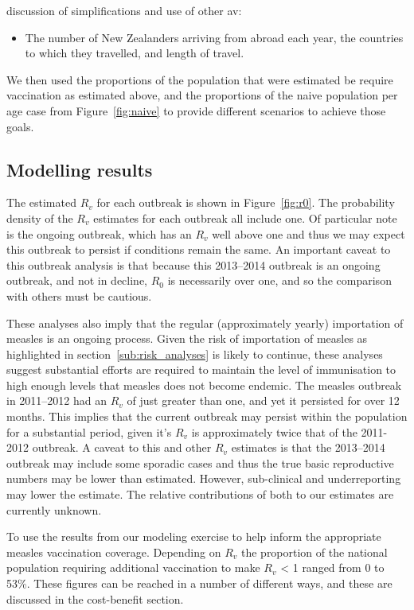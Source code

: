 \documentclass{article}
\begin{document}
discussion of simplifications and use of other av:
\begin {itemize}
\item The number of New Zealanders arriving from abroad each year, the countries to which they travelled, and length of travel.
\end{itemize}

We then used the proportions of the population that were estimated be require vaccination as estimated above, and the proportions of the naive population per age case from Figure~\ref{fig:naive} to provide different scenarios to achieve those goals.

\subsection{Modelling results}

The estimated $R_v$ for each outbreak is shown in Figure~\ref{fig:r0}. The probability density of the $R_v$ estimates for each outbreak all include one. Of particular note is the ongoing outbreak, which has an $R_v$ well above one and thus we may expect this outbreak to persist if conditions remain the same. An important caveat to this outbreak analysis is that because this 2013--2014 outbreak is an ongoing outbreak, and not in decline, $R_0$ is necessarily over one, and so the comparison with others must be cautious.

These analyses also imply that the regular (approximately yearly) importation of measles is an ongoing process. Given the risk of importation of measles as highlighted in section~\ref{sub:risk_analyses} is likely to continue, these analyses suggest substantial efforts are required to maintain the level of immunisation to high enough levels that measles does not become endemic. The measles outbreak in 2011--2012 had an $R_v$ of just greater than one, and yet it persisted for over 12 months. This implies that the current outbreak may persist within the population for a substantial period, given it's $R_v$ is approximately twice that of the 2011-2012 outbreak. A caveat to this and other $R_v$ estimates is that the 2013--2014 outbreak may include some sporadic cases and thus the true basic reproductive numbers may be lower than estimated. However, sub-clinical and underreporting may lower the estimate. The relative contributions of both to our estimates are currently unknown.

To use the results from our modeling exercise to help inform the appropriate measles vaccination coverage. Depending on $R_v$ the proportion of the national population requiring additional vaccination to make $R_v$ < 1 ranged from 0 to 53\%. These figures can be reached in a number of different ways, and these are discussed in the cost-benefit section.
\end{document}
